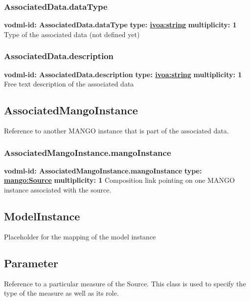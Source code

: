     \subsubsection{AssociatedData.dataType}
      \textbf{vodml-id: AssociatedData.dataType} \newline
      \textbf{type: \hyperref[sect:ivoa]{ivoa:string}} \newline
      \textbf{multiplicity: 1} \newline 
      Type of the associated data (not defined yet)

    \subsubsection{AssociatedData.description}
      \textbf{vodml-id: AssociatedData.description} \newline
      \textbf{type: \hyperref[sect:ivoa]{ivoa:string}} \newline
      \textbf{multiplicity: 1} \newline 
      Free text description of the associated data

  \subsection{AssociatedMangoInstance}
  \label{sect:AssociatedMangoInstance}
    Reference to another MANGO instance that is part of the associated data.

    \subsubsection{AssociatedMangoInstance.mangoInstance}
      \textbf{vodml-id: AssociatedMangoInstance.mangoInstance} \newline
      \textbf{type: \hyperref[sect:Source]{mango:Source}} \newline
      \textbf{multiplicity: 1} \newline 
      Composition link pointing on one MANGO instance associated with the source.

  \subsection{ModelInstance}
  \label{sect:ModelInstance}
    Placeholder for the mapping of the model instance

  \subsection{Parameter}
  \label{sect:Parameter}
    Reference to a particular measure of the Source. This class is used to specify the type of the measure as well as its role.

